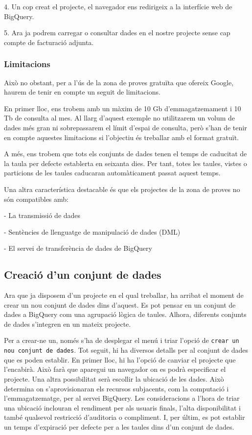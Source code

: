 \documentclass[12pt,longbibliography]{article}
\theoremstyle{definition}
\theoremstyle{remark}
\begin{document}
4. Un cop creat el projecte, el navegador ens redirigeix a la interfície web de BigQuery.



5. Ara ja podrem carregar o consultar dades en el nostre projecte sense cap compte de facturació adjunta.

\subsubsection{Limitacions}

Això no obstant, per a l’ús de la zona de proves gratuïta que ofereix Google, haurem de tenir en compte un seguit de limitacions.



En primer lloc, ens trobem amb un màxim de 10 Gb d’emmagatzemament i 10 Tb de consulta al mes. Al llarg d’aquest exemple no utilitzarem un volum de dades més gran ni sobrepassarem el límit d’espai de consulta, però s’han de tenir en compte aquestes limitacions si l’objectiu és treballar amb el format gratuït.



A més, ens trobem que tots els conjunts de dades tenen el temps de caducitat de la taula per defecte establerta en seixanta dies. Per tant, totes les taules, vistes o particions de les taules caducaran automàticament passat aquest temps.



Una altra característica destacable és que els projectes de la zona de proves no són compatibles amb:

- La transmissió de dades

- Sentències de llenguatge de manipulació de dades (DML)

- El servei de transferència de dades de BigQuery

\subsection{Creació d'un conjunt de dades}

Ara que ja disposem d'un projecte en el qual treballar, ha arribat el moment de crear un nou conjunt de dades dins d'aquest. Es pot pensar en un conjunt de dades a BigQuery com una agrupació lògica de taules. Alhora, diferents conjunts de dades s'integren en un mateix projecte. 



Per a crear-ne un, només s'ha de desplegar el menú i triar l'opció de \texttt{crear un nou conjunt de dades}. Tot seguit, hi ha diversos detalls per al conjunt de dades que es poden establir. En primer lloc, hi ha l'opció de canviar el projecte que l'encabirà. Això farà que aparegui un navegador on es podrà especificar el projecte. Una altra possibilitat serà escollir la ubicació de les dades. Això determina on s'aprovisionaran els recursos subjacents, com la computació i l'emmagatzematge, per al servei BigQuery. Les consideracions a l'hora de triar una ubicació inclouran el rendiment per als usuaris finals, l'alta disponibilitat i també qualsevol restricció d'auditoria o compliment. I, per últim, es pot establir un temps d'expiració per defecte per a les taules dins d'un conjunt de dades.
\end{document}
